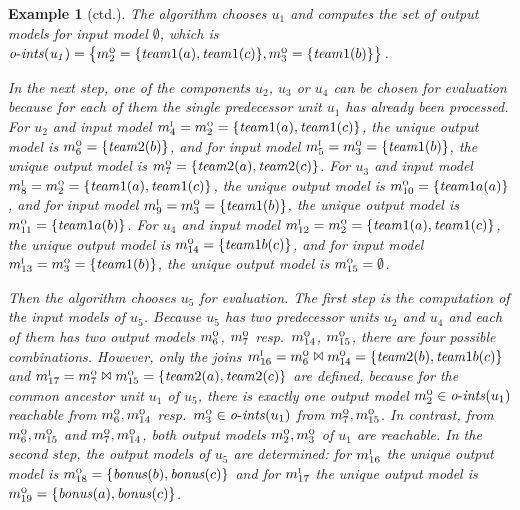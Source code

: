\documentclass[11pt,fleqn,twoside]{article}
\newtheorem{example}{Example}
\begin{document}
{\begin{example}[ctd.]
				The algorithm chooses $u_1$ and computes the set of output models for input model $\emptyset$,
				which is $\mathit{o\mbox{-}ints(u_1)} = \big\{ m_2^{\textsc{o}} = \{\mathit{team}1(a), \mathit{team}1(c)\}, m_3^{\textsc{o}} = \{\mathit{team}1(b)\} \big\}$.
				
				In the next step, one of the components $u_2$, $u_3$ or $u_4$ can be chosen for evaluation
				because for each of them the single predecessor unit $u_1$ has already been processed.
				For $u_2$ and input model $m_4^{\textsc{i}} = m_2^{\textsc{o}} = \{\mathit{team}1(a), \mathit{team}1(c)\}$,
				the unique output model is $m_6^{\textsc{o}} = \{ \mathit{team}2(b) \}$,
				and for input model $m_5^{\textsc{i}} = m_3^{\textsc{o}} = \{\mathit{team}1(b)\}$,
				the unique output model is $m_7^{\textsc{o}} = \{ \mathit{team}2(a), \mathit{team}2(c) \}$.
				For $u_3$ and input model $m_8^{\textsc{i}} = m_2^{\textsc{o}} = \{\mathit{team}1(a), \mathit{team}1(c)\}$,
				the unique output model is $m_{10}^{\textsc{o}} = \{ \mathit{team}{1a}(a) \}$,
				and for input model $m_{9}^{\textsc{i}} = m_3^{\textsc{o}} = \{\mathit{team}1(b)\}$,
				the unique output model is $m_{11}^{\textsc{o}} = \{ \mathit{team}{1a}(b) \}$.
				For $u_4$ and input model $m_{12}^{\textsc{i}} = m_2^{\textsc{o}} = \{\mathit{team}1(a), \mathit{team}1(c)\}$,
				the unique output model is $m_{14}^{\textsc{o}} = \{ \mathit{team}{1b}(c) \}$,
				and for input model $m_{13}^{\textsc{i}} = m_3^{\textsc{o}} = \{\mathit{team}1(b)\}$,
				the unique output model is $m_{15}^{\textsc{o}} = \emptyset$.
				
				Then the algorithm chooses $u_5$ for evaluation.
				The first step is the computation of the input models of $u_5$.
				Because $u_5$ has two predecessor units $u_2$ and $u_4$ and each of them has
				two output models $m_6^{\textsc{o}}$, $m_7^{\textsc{o}}$ resp.~$m_{14}^{\textsc{o}}$, $m_{15}^{\textsc{o}}$,
				there are four possible combinations.
				However, only the joins $m_{16}^{\textsc{i}} = m_6^{\textsc{o}} \Join m_{14}^{\textsc{o}} = \{ \mathit{team}2(b), \mathit{team}{1b}(c) \}$
				and $m_{17}^{\textsc{i}} = m_7^{\textsc{o}} \Join m_{15}^{\textsc{o}} = \{ \mathit{team}2(a), \mathit{team}2(c) \}$
				are defined, because for the common ancestor unit $u_1$ of $u_5$,
				there is exactly one output model $m_2^{\textsc{o}} \in \mathit{o\mbox{-}ints}(u_1)$ reachable from $m_6^{\textsc{o}}, m_{14}^{\textsc{o}}$
				resp.~$m_3^{\textsc{o}} \in \mathit{o\mbox{-}ints}(u_1)$ from $m_7^{\textsc{o}}, m_{15}^{\textsc{o}}$.
				In contrast, from $m_6^{\textsc{o}}, m_{15}^{\textsc{o}}$ and $m_7^{\textsc{o}}, m_{14}^{\textsc{o}}$, both output models
				$m_2^{\textsc{o}}, m_3^{\textsc{o}}$ of $u_1$ are reachable.
				In the second step, the output models of $u_5$ are determined: for $m_{16}^{\textsc{i}}$
				the unique output model is $m_{18}^{\textsc{o}} = \{ \mathit{bonus}(b), \mathit{bonus}(c) \}$
				and for $m_{17}^{\textsc{i}}$ the unique output model is
				$m_{19}^{\textsc{o}} = \{ \mathit{bonus}(a), \mathit{bonus}(c) \}$.
				

\end{example}}
\end{document}
